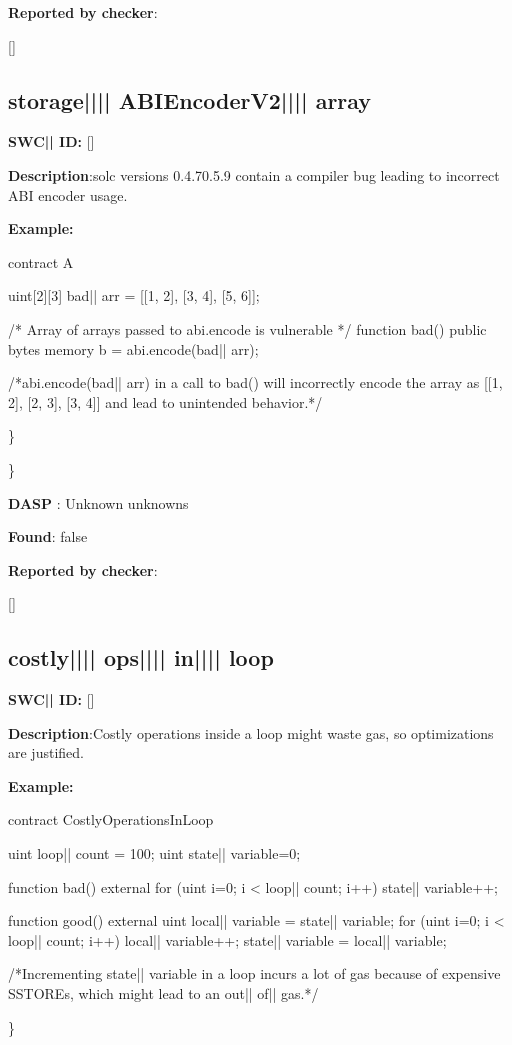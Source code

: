 \documentclass{article}
\begin{document}
\textbf{Reported by checker}: 
\begin{ffcode} 

[]
\end{ffcode} 
\subsection{storage{||\textunderscore|| }ABIEncoderV2{||\textunderscore|| }array} 
\textbf{SWC{|\textunderscore| }ID:} []

\textbf{Description}:solc versions 0.4.7{\textendash}0.5.9 contain a compiler bug leading to incorrect ABI encoder usage.


\textbf{Example:} 
\begin{ffcode} 

contract A {
    uint[2][3] bad|\textunderscore| arr = [[1, 2], [3, 4], [5, 6]];

    /* Array of arrays passed to abi.encode is vulnerable */
    function bad() public {
        bytes memory b = abi.encode(bad|\textunderscore| arr);
    }
}

 /*abi.encode(bad|\textunderscore| arr) in a call to bad() will incorrectly encode the array as [[1, 2], [2, 3], [3, 4]] and lead to unintended behavior.*/ 

\end{ffcode} 
\} 

\} 

\textbf{DASP} : Unknown unknowns

\textbf{Found}: false

\textbf{Reported by checker}: 
\begin{ffcode} 

[]
\end{ffcode} 
\subsection{costly{||\textunderscore|| }ops{||\textunderscore|| }in{||\textunderscore|| }loop} 
\textbf{SWC{|\textunderscore| }ID:} []

\textbf{Description}:Costly operations inside a loop might waste gas, so optimizations are justified.


\textbf{Example:} 
\begin{ffcode} 

contract CostlyOperationsInLoop{

    uint loop|\textunderscore| count = 100;
    uint state|\textunderscore| variable=0;

    function bad() external{
        for (uint i=0; i < loop|\textunderscore| count; i++){
            state|\textunderscore| variable++;
        }
    }

    function good() external{
      uint local|\textunderscore| variable = state|\textunderscore| variable;
      for (uint i=0; i < loop|\textunderscore| count; i++){
        local|\textunderscore| variable++;
      }
      state|\textunderscore| variable = local|\textunderscore| variable;
    }
}
 /*Incrementing state|\textunderscore| variable in a loop incurs a lot of gas because of expensive SSTOREs, which might lead to an out|\textendash| of|\textendash| gas.*/ 

\end{ffcode} 
\} 
\end{document}

